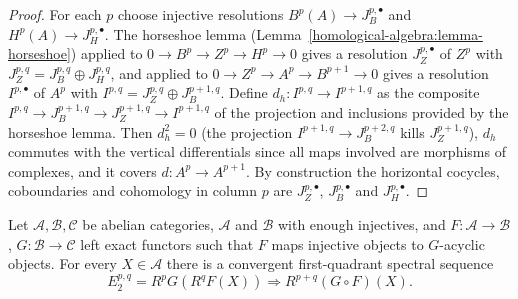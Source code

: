 \begin{proof}
For each $p$ choose injective resolutions $B^p(A) \to J_B^{p,\bullet}$ and $H^p(A) \to J_H^{p,\bullet}$. The horseshoe lemma
(Lemma~\ref{homological-algebra:lemma-horseshoe}) applied to $0 \to B^p \to Z^p \to H^p \to 0$ gives a resolution $J_Z^{p,\bullet}$ of $Z^p$ with
$J_Z^{p,q} = J_B^{p,q} \oplus J_H^{p,q}$, and applied to $0 \to Z^p \to A^p \to B^{p+1} \to 0$ gives a resolution $I^{p,\bullet}$ of $A^p$ with
$I^{p,q} = J_Z^{p,q} \oplus J_B^{p+1,q}$. Define $d_h \colon I^{p,q} \to I^{p+1,q}$ as the composite
$I^{p,q} \to J_B^{p+1,q} \to J_Z^{p+1,q} \to I^{p+1,q}$ of the projection and inclusions provided by the horseshoe lemma. Then $d_h^2 = 0$ (the
projection $I^{p+1, q} \to J_B^{p+2,q}$ kills $J_Z^{p+1,q}$), $d_h$ commutes with the vertical differentials since all maps involved are morphisms
of complexes, and it covers $d \colon A^p \to A^{p+1}$. By construction the horizontal cocycles, coboundaries and cohomology in column $p$ are
$J_Z^{p,\bullet}$, $J_B^{p,\bullet}$ and $J_H^{p,\bullet}$.
\end{proof}

\begin{theorem}\label{spectral-sequences:theorem-grothendieck}
Let $\mathcal{A}, \mathcal{B}, \mathcal{C}$ be abelian categories, $\mathcal{A}$ and $\mathcal{B}$ with enough injectives, and $F \colon \mathcal{A} \to \mathcal{B}$,
$G \colon \mathcal{B} \to \mathcal{C}$ left exact functors such that $F$ maps injective objects to $G$-acyclic objects. For every $X \in \mathcal{A}$ there is a
convergent first-quadrant spectral sequence
\[
E_2^{p,q} = R^pG(R^qF(X)) \Rightarrow R^{p+q}(G \circ F)(X).
\]
\end{theorem}

